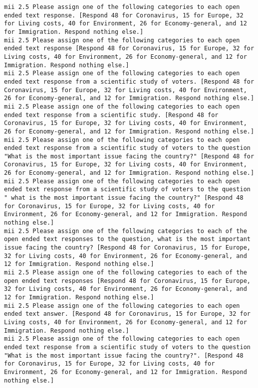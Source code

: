 \begin{lstlisting}[label=lst:promptvariants]
mii	2.5	Please assign one of the following categories to each open ended text response. [Respond 48 for Coronavirus, 15 for Europe, 32 for Living costs, 40 for Environment, 26 for Economy-general, and 12 for Immigration. Respond nothing else.]
mii	2.5	Please assign one of the following categories to each open ended text response [Respond 48 for Coronavirus, 15 for Europe, 32 for Living costs, 40 for Environment, 26 for Economy-general, and 12 for Immigration. Respond nothing else.]
mii	2.5	Please assign one of the following categories to each open ended text response from a scientific study of voters. [Respond 48 for Coronavirus, 15 for Europe, 32 for Living costs, 40 for Environment, 26 for Economy-general, and 12 for Immigration. Respond nothing else.]
mii	2.5	Please assign one of the following categories to each open ended text response from a scientific study. [Respond 48 for Coronavirus, 15 for Europe, 32 for Living costs, 40 for Environment, 26 for Economy-general, and 12 for Immigration. Respond nothing else.]
mii	2.5	Please assign one of the following categories to each open ended text response from a scientific study of voters to the question "What is the most important issue facing the country?" [Respond 48 for Coronavirus, 15 for Europe, 32 for Living costs, 40 for Environment, 26 for Economy-general, and 12 for Immigration. Respond nothing else.]
mii	2.5	Please assign one of the following categories to each open ended text response from a scientific study of voters to the question " what is the most important issue facing the country?" [Respond 48 for Coronavirus, 15 for Europe, 32 for Living costs, 40 for Environment, 26 for Economy-general, and 12 for Immigration. Respond nothing else.]
mii	2.5	Please assign one of the following categories to each of the open ended text responses to the question, what is the most important issue facing the country? [Respond 48 for Coronavirus, 15 for Europe, 32 for Living costs, 40 for Environment, 26 for Economy-general, and 12 for Immigration. Respond nothing else.]
mii	2.5	Please assign one of the following categories to each of the open ended text responses [Respond 48 for Coronavirus, 15 for Europe, 32 for Living costs, 40 for Environment, 26 for Economy-general, and 12 for Immigration. Respond nothing else.]
mii	2.5	Please assign one of the following categories to each open ended text answer. [Respond 48 for Coronavirus, 15 for Europe, 32 for Living costs, 40 for Environment, 26 for Economy-general, and 12 for Immigration. Respond nothing else.]
mii	2.5	Please assign one of the following categories to each open ended text response from a scientific study of voters to the question "What is the most important issue facing the country?". [Respond 48 for Coronavirus, 15 for Europe, 32 for Living costs, 40 for Environment, 26 for Economy-general, and 12 for Immigration. Respond nothing else.]

\end{lstlisting}
